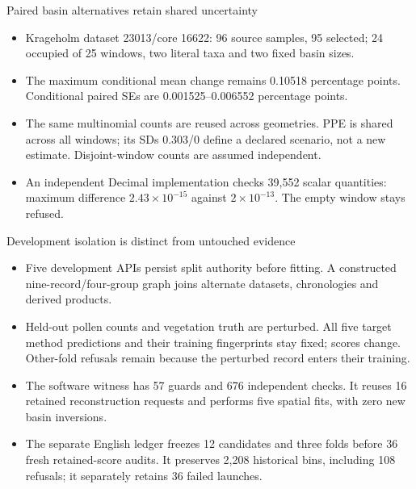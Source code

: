 \begin{frame}{Paired basin alternatives retain shared uncertainty}
\small
\begin{itemize}
\item Krageholm dataset 23013/core 16622: 96 source samples, 95 selected; 24 occupied of 25 windows, two literal taxa and two fixed basin sizes.
\item The maximum conditional mean change remains 0.10518 percentage points. Conditional paired SEs are 0.001525--0.006552 percentage points.
\item The same multinomial counts are reused across geometries. PPE is shared across all windows; its SDs 0.303/0 define a declared scenario, not a new estimate. Disjoint-window counts are assumed independent.
\item An independent Decimal implementation checks 39,552 scalar quantities: maximum difference $2.43\times10^{-15}$ against $2\times10^{-13}$. The empty window stays refused.
\end{itemize}
\end{frame}

\begin{frame}{Development isolation is distinct from untouched evidence}
\small
\begin{itemize}
\item Five development APIs persist split authority before fitting. A constructed nine-record/four-group graph joins alternate datasets, chronologies and derived products.
\item Held-out pollen counts and vegetation truth are perturbed. All five target method predictions and their training fingerprints stay fixed; scores change. Other-fold refusals remain because the perturbed record enters their training.
\item The software witness has 57 guards and 676 independent checks. It reuses 16 retained reconstruction requests and performs five spatial fits, with zero new basin inversions.
\item The separate English ledger freezes 12 candidates and three folds before 36 fresh retained-score audits. It preserves 2,208 historical bins, including 108 refusals; it separately retains 36 failed launches.
\end{itemize}
\end{frame}


